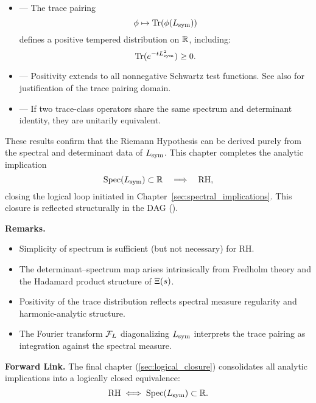 \begin{itemize}
  \item {} — The trace pairing
  \[
  \phi \mapsto \operatorname{Tr}(\phi(L_{\mathrm{sym}}))
  \]
  defines a positive tempered distribution on \( \mathbb{R} \), including:
  \[
  \operatorname{Tr}(e^{-t L_{\mathrm{sym}}^2}) \ge 0.
  \]

  \item {} — Positivity extends to all nonnegative Schwartz test functions. See also  for justification of the trace pairing domain.

  \item {} — If two trace-class operators share the same spectrum and determinant identity, they are unitarily equivalent.
\end{itemize}

These results confirm that the Riemann Hypothesis can be derived purely from the spectral and determinant data of \( L_{\mathrm{sym}} \). This chapter completes the analytic implication
\[
\operatorname{Spec}(L_{\mathrm{sym}}) \subset \mathbb{R} \quad \Longrightarrow \quad \mathrm{RH},
\]
closing the logical loop initiated in Chapter~\ref{sec:spectral_implications}. This closure is reflected structurally in the DAG ().

\medskip

\noindent
\textbf{Remarks.}
\begin{itemize}
  \item Simplicity of spectrum is sufficient (but not necessary) for RH.
  \item The determinant–spectrum map arises intrinsically from Fredholm theory and the Hadamard product structure of \( \Xi(s) \).
  \item Positivity of the trace distribution reflects spectral measure regularity and harmonic-analytic structure.
  \item The Fourier transform \( \mathcal{F}_L \) diagonalizing \( L_{\mathrm{sym}} \) interprets the trace pairing as integration against the spectral measure.
\end{itemize}

\medskip

\noindent
\textbf{Forward Link.}  
The final chapter (\cref{sec:logical_closure}) consolidates all analytic implications into a logically closed equivalence:
\[
\mathrm{RH} \iff \operatorname{Spec}(L_{\mathrm{sym}}) \subset \mathbb{R}.
\]
